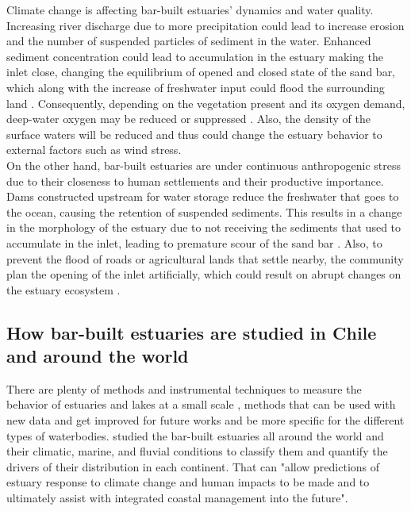 \documentclass[tesis.tex]{subfiles}
\begin{document}
Climate change is affecting bar-built estuaries' dynamics and water quality. Increasing river discharge due to more precipitation could lead to increase erosion and the number of suspended particles of sediment in the water. Enhanced sediment concentration could lead to accumulation in the estuary making the inlet close, changing the equilibrium of opened and closed state of the sand bar, which along with the increase of freshwater input could flood the surrounding land \citep{peeters2009currents}. Consequently, depending on the vegetation present and its oxygen demand, deep-water oxygen may be reduced or suppressed \citep{Kelly2018, Largier2021}. Also, the density of the surface waters will be reduced and thus could change the estuary behavior to external factors such as wind stress. \\

On the other hand, bar-built estuaries are under continuous anthropogenic stress due to their closeness to human settlements \citep{clark2019systematic} and their productive importance. Dams constructed upstream for water storage reduce the freshwater that goes to the ocean, causing the retention of suspended sediments. This results in a change in the morphology of the estuary due to not receiving the sediments that used to accumulate in the inlet, leading to premature scour of the sand bar \citep{peeters2009currents}. Also, to prevent the flood of roads or agricultural lands that settle nearby, the community plan the opening of the inlet artificially, which could result on abrupt changes on the estuary ecosystem \cite{Behrens2013}. \\

\subsection{How bar-built estuaries are studied in Chile and around the world}

There are plenty of methods and instrumental techniques to measure the behavior of estuaries and lakes at a small scale \citep{Wuest2003}, methods that can be used with new data and get improved for future works and be more specific for the different types of waterbodies. \cite{mcsweeney2017intermittently} studied the bar-built estuaries all around the world and their climatic, marine, and fluvial conditions to classify them and quantify the drivers of their distribution in each continent. That can "allow predictions of estuary response to climate change and human impacts to be made and to ultimately assist with integrated coastal management into the future".\\
\end{document}
